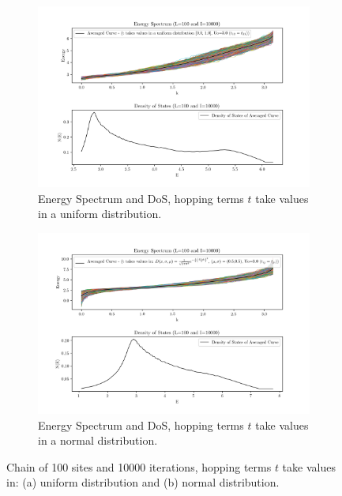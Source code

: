 \documentclass[12pt]{article}
\begin{document}
\begin{figure}[ht]
		\centering
        \begin{subfigure}[a]{\textwidth}
        		\centering
                \includegraphics[scale=0.65]{EDOSRoCU.png}
                \caption{Energy Spectrum and DoS, hopping terms $t$ take values in a uniform distribution.}
                \label{f4a}
        \end{subfigure}
        \begin{subfigure}[b]{\textwidth}
        		\centering
                \includegraphics[scale=0.65]{EDOSRoCN.png}
                \caption{ Energy Spectrum and DoS, hopping terms $t$ take values in a normal distribution.}
                \label{f4b}
        \end{subfigure}
        \caption{Chain of 100 sites and 10000 iterations, hopping terms $t$ take values in: (a) uniform distribution and (b)  normal distribution.}
        \label{f4}
\end{figure}
\end{document}
